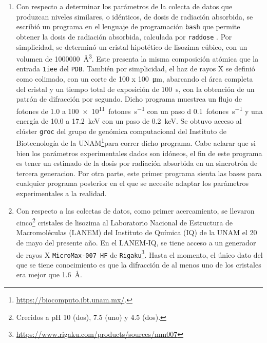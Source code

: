 \begin{enumerate}
	\item Con respecto a determinar los parámetros de la colecta de datos que produzcan niveles similares, o idénticos, de dosis de radiación absorbida, se escribió un programa en el lenguaje de programación \verb|bash| que permite obtener la dosis de radiación absorbida,  calculada por \verb|raddose| \cite{Bury2018}. Por simplicidad, se determinó un cristal hipotético de lisozima cúbico, con un volumen de \SI{1000000}{\cubic\angstrom}. Este presenta la misma composición atómica que la entrada \verb|1iee| del \verb|PDB|. También por simplicidad, el haz de rayos X se definió como colimado, con un corte de \num{100} x  \SI{100}{\micro\meter}, abarcando el área completa del cristal y un tiempo total de exposición de \SI{100}{\second}, con la obtención de un patrón de difracción por segundo. Dicho programa muestrea un flujo de fotones de 1.0 a \SI{100e11}{fotones\per\second} con un paso d \SI{0.1}{fotones\per\second} y una energía de 10.0 a \SI{17.2}{\kilo\electronvolt} con un paso de \SI{0.2}{\kilo\electronvolt}. Se obtuvo acceso al clúster \verb|groc| del grupo de genómica computacional del Instituto de Biotecnología de la UNAM\footnote{\url{https://biocomputo.ibt.unam.mx/}.}para correr dicho programa. Cabe aclarar que si bien los parámetros experimentales dados son idóneos, el fin de este programa es tener un estimado de la dosis por radiación absorbida en un sincrotrón de tercera generacion. Por otra parte, este primer programa sienta las bases para cualquier programa posterior en el que se necesite adaptar los parámetros experimentales a la realidad.
	 
	\item Con respecto a las colectas de datos, como primer acercamiento, se llevaron cinco\footnote{Crecidos a pH 10 (dos), 7.5 (uno) y 4.5 (dos).} cristales de lisozima al Laboratorio Nacional de Estructura de Macromoléculas (LANEM) del Instituto de Química (IQ) de la UNAM el 20 de mayo del presente año. En el LANEM-IQ, se tiene acceso a un generador de rayos X \verb|MicroMax-007 HF| de \verb|Rigaku|\footnote{\url{https://www.rigaku.com/products/sources/mm007}}. Hasta el momento, el único dato del que se tiene conocimiento es que la difracción de al menos uno de los cristales era mejor que \SI{1.6}{\angstrom}. 
	\end{enumerate}
